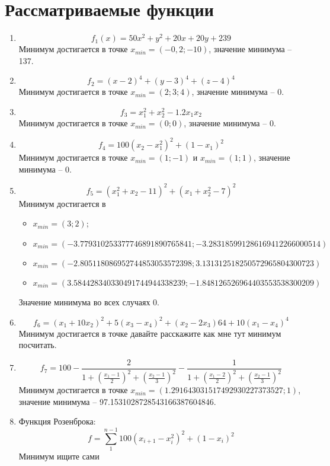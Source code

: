 \documentclass[12pt]{article}
\begin{document}
\newpage
\section{Рассматриваемые функции}

\begin{enumerate}
 	\item \[f_1(x) = 50x^2+y^2+20x+20y+239\]
 	Минимум достигается в точке $x_{min} = (-0,2; -10)$, значение минимума -- 137.
 	
 	\item \[f_2 = (x-2)^4+(y-3)^4+(z-4)^4\]
 	Минимум достигается в точке $x_{min} = (2; 3; 4)$, значение минимума -- 0.
 	
 	\item \[f_3 = x_1^2+x_2^2-1.2x_1x_2\]
 	Минимум достигается в точке $x_{min} = (0; 0)$, значение минимума -- 0.
 	
 	\item \[f_4 = 100 (x_2-x_1^2)^2+(1-x_1)^2\]
 	Минимум достигается в точке $x_{min} = (1; -1)$ и $x_{min} = (1; 1)$, значение минимума -- 0.
 	
 	\item \[ f_5 = (x_1^2+x_2-11)^2+(x_1+x_2^2-7)^2 \] 
 	Минимум достигается в 
 	\begin{itemize}
 		\item $x_{min} = (3; 2)$;
 		\item $x_{min} = (-3.779310253377746891890765841; -3.283185991286169412266000514)$
 		\item $x_{min} = (-2.805118086952744853053572398; 3.131312518250572965804300723)$
 		\item $x_{min} = (3.584428340330491744944338239; -1.848126526964403553538300209)$
 	\end{itemize} 
 	Значение минимума во всех случаях 0.
 	 	
 	\item \[ f_6 = (x_1+10x_2)^2+5(x_3-x_4)^2+(x_2-2x_3)64+10(x_1-x_4)^4 \]
 	Минимум достигается в точке давайте расскажите как мне тут минимум посчитать.
 	
 	\item \[ f_7 = 100 - \frac{2}{1+\left( \frac{x_1-1}{2} \right) ^2 + \left( \frac{x_2-1}{3} \right) ^2} - \frac{1}{1+\left( \frac{x_1-2}{2} \right) ^2 + \left( \frac{x_2-1}{3} \right) ^2}\] 
 	Минимум достигается в точке $x_{min} = (1.291643031517492930227373527; 1)$, значение минимума -- 97.1531028728543166387604846.
 	
 	\item Функция Розенброка:
 	\[ f = \sum_1^{n-1} 100(x_{i+1}-x_i^2)^2+(1-x_i)^2 \]
 	Минимум ищите сами
\end{enumerate}
\end{document}
